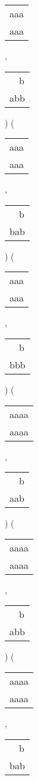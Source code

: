 \begin{description}
\begin{tabular}{|l|}
aaa \\
aaa \\
\hline
\end{tabular} 
 , 
\begin{tabular}{|l|} \hline
\ \ b \\
abb \\
\hline
\end{tabular} 
) 
 ( 
\begin{tabular}{|l|} \hline
aaa \\
aaa \\
\hline
\end{tabular} 
 , 
\begin{tabular}{|l|} \hline
\ \ b \\
bab \\
\hline
\end{tabular} 
) 
 ( 
\begin{tabular}{|l|} \hline
aaa \\
aaa \\
\hline
\end{tabular} 
 , 
\begin{tabular}{|l|} \hline
\ \ b \\
bbb \\
\hline
\end{tabular} 
) 
 ( 
\begin{tabular}{|l|} \hline
aaaa \\
aaaa \\
\hline
\end{tabular} 
 , 
\begin{tabular}{|l|} \hline
\ \ b \\
aab \\
\hline
\end{tabular} 
) 
 ( 
\begin{tabular}{|l|} \hline
aaaa \\
aaaa \\
\hline
\end{tabular} 
 , 
\begin{tabular}{|l|} \hline
\ \ b \\
abb \\
\hline
\end{tabular} 
) 
 ( 
\begin{tabular}{|l|} \hline
aaaa \\
aaaa \\
\hline
\end{tabular} 
 , 
\begin{tabular}{|l|} \hline
\ \ b \\
bab \\

\end{tabular}
\end{description}
